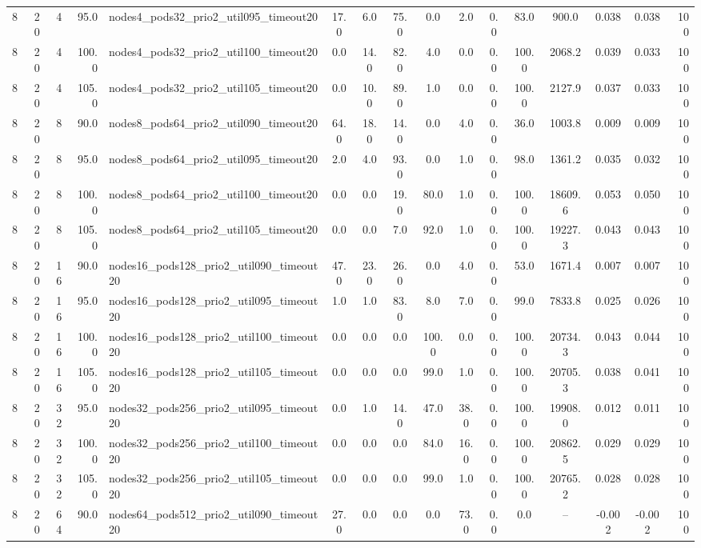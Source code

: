 \begin{tabular}{r r r r l c c c c c c c c c c r}
8 & 20 & 4 & 95.0 & nodes4\_pods32\_prio2\_util095\_timeout20 & 17.0 & 6.0 & 75.0 & 0.0 & 2.0 & 0.0 & 83.0 & 900.0 & 0.038 & 0.038 & 100 \\
8 & 20 & 4 & 100.0 & nodes4\_pods32\_prio2\_util100\_timeout20 & 0.0 & 14.0 & 82.0 & 4.0 & 0.0 & 0.0 & 100.0 & 2068.2 & 0.039 & 0.033 & 100 \\
8 & 20 & 4 & 105.0 & nodes4\_pods32\_prio2\_util105\_timeout20 & 0.0 & 10.0 & 89.0 & 1.0 & 0.0 & 0.0 & 100.0 & 2127.9 & 0.037 & 0.033 & 100 \\
8 & 20 & 8 & 90.0 & nodes8\_pods64\_prio2\_util090\_timeout20 & 64.0 & 18.0 & 14.0 & 0.0 & 4.0 & 0.0 & 36.0 & 1003.8 & 0.009 & 0.009 & 100 \\
8 & 20 & 8 & 95.0 & nodes8\_pods64\_prio2\_util095\_timeout20 & 2.0 & 4.0 & 93.0 & 0.0 & 1.0 & 0.0 & 98.0 & 1361.2 & 0.035 & 0.032 & 100 \\
8 & 20 & 8 & 100.0 & nodes8\_pods64\_prio2\_util100\_timeout20 & 0.0 & 0.0 & 19.0 & 80.0 & 1.0 & 0.0 & 100.0 & 18609.6 & 0.053 & 0.050 & 100 \\
8 & 20 & 8 & 105.0 & nodes8\_pods64\_prio2\_util105\_timeout20 & 0.0 & 0.0 & 7.0 & 92.0 & 1.0 & 0.0 & 100.0 & 19227.3 & 0.043 & 0.043 & 100 \\
8 & 20 & 16 & 90.0 & nodes16\_pods128\_prio2\_util090\_timeout20 & 47.0 & 23.0 & 26.0 & 0.0 & 4.0 & 0.0 & 53.0 & 1671.4 & 0.007 & 0.007 & 100 \\
8 & 20 & 16 & 95.0 & nodes16\_pods128\_prio2\_util095\_timeout20 & 1.0 & 1.0 & 83.0 & 8.0 & 7.0 & 0.0 & 99.0 & 7833.8 & 0.025 & 0.026 & 100 \\
8 & 20 & 16 & 100.0 & nodes16\_pods128\_prio2\_util100\_timeout20 & 0.0 & 0.0 & 0.0 & 100.0 & 0.0 & 0.0 & 100.0 & 20734.3 & 0.043 & 0.044 & 100 \\
8 & 20 & 16 & 105.0 & nodes16\_pods128\_prio2\_util105\_timeout20 & 0.0 & 0.0 & 0.0 & 99.0 & 1.0 & 0.0 & 100.0 & 20705.3 & 0.038 & 0.041 & 100 \\
8 & 20 & 32 & 95.0 & nodes32\_pods256\_prio2\_util095\_timeout20 & 0.0 & 1.0 & 14.0 & 47.0 & 38.0 & 0.0 & 100.0 & 19908.0 & 0.012 & 0.011 & 100 \\
8 & 20 & 32 & 100.0 & nodes32\_pods256\_prio2\_util100\_timeout20 & 0.0 & 0.0 & 0.0 & 84.0 & 16.0 & 0.0 & 100.0 & 20862.5 & 0.029 & 0.029 & 100 \\
8 & 20 & 32 & 105.0 & nodes32\_pods256\_prio2\_util105\_timeout20 & 0.0 & 0.0 & 0.0 & 99.0 & 1.0 & 0.0 & 100.0 & 20765.2 & 0.028 & 0.028 & 100 \\
8 & 20 & 64 & 90.0 & nodes64\_pods512\_prio2\_util090\_timeout20 & 27.0 & 0.0 & 0.0 & 0.0 & 73.0 & 0.0 & 0.0 & -- & -0.002 & -0.002 & 100 \\

\end{tabular}
